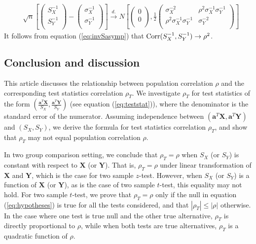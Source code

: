 	\begin{equation}\label{eq:invSasymp}
	\begin{aligned}
	& \sqrt{n}\left[\left( \begin{array}{c}
	S_X^{-1}\\
	S_Y^{-1}\\
	\end{array}\right)
	-
	\left( \begin{array}{c}
	\sigma_X^{-1}\\
	\sigma_Y^{-1}\\
	\end{array}\right)
	\right]
	\stackrel{d.}{\longrightarrow} 
	N\left[
	\left(\begin{array}{c}
	0\\
	0\\
	\end{array} \right), 
	\frac{1}{2}\left(
	\begin{array}{cc}
	\sigma_X^{-2} &\rho^2\sigma_X^{-1}\sigma_Y^{-1} \\
	\rho^2\sigma_X^{-1}\sigma_Y^{-1}  &\sigma_Y^{-2} \\
	\end{array}
	\right)
	\right] 
	\end{aligned}
	\end{equation}
	It follows from equation (\ref{eq:invSasymp}) that $\text{Corr}(S_X^{-1}, S_Y^{-1}) \rightarrow 
	\rho^2$.
	
	
	
	\subsection{Conclusion and discussion}
	
	This article discusses the relationship between population correlation $\rho$ and the 
	corresponding test statistics correlation $\rho_T$. We investigate $\rho_T$ for test statistics 
	of the form $(\frac{\bm a^T\bm X}{S_X}, \frac{\bm a^T\bm Y}{S_Y})$ (see equation 
	(\ref{eq:teststat})), where the denominator is the standard error of the numerator. Assuming 
	independence between $(\bm a^T\bm X, \bm a^T\bm Y)$ and $(S_X, S_Y)$, we derive the formula for 
	test statistics correlation $\rho_T$, and show that $\rho_T$ may not equal population 
	correlation $\rho$.  
	
	In two group comparison setting, we conclude that $\rho_T = \rho$ when $S_X$ (or $S_Y$) is 
	constant with respect to $\bm X$ (or $\bm Y$). That is, $\rho_T = \rho$ under linear 
	transformation of $\bm X$ and $\bm Y$, which is the case for two sample $z$-test. However, when 
	$S_X$ (or $S_Y$) is a function of $\bm X$ (or $\bm Y$), as is the case of two
	sample $t$-test, this equality may not hold. For two sample $t$-test, we prove that 
	$\rho_T=\rho$ only if the null in equation (\ref{eq:hypotheses}) is true for all the tests 
	considered, and that $|\rho_T|\leq |\rho|$ otherwise. In the case where one test is true null 
	and the other true alternative, $\rho_T$ is directly proportional to $\rho$, while when both 
	tests are true alternatives, $\rho_T$ is a quadratic function of $\rho$.
	
